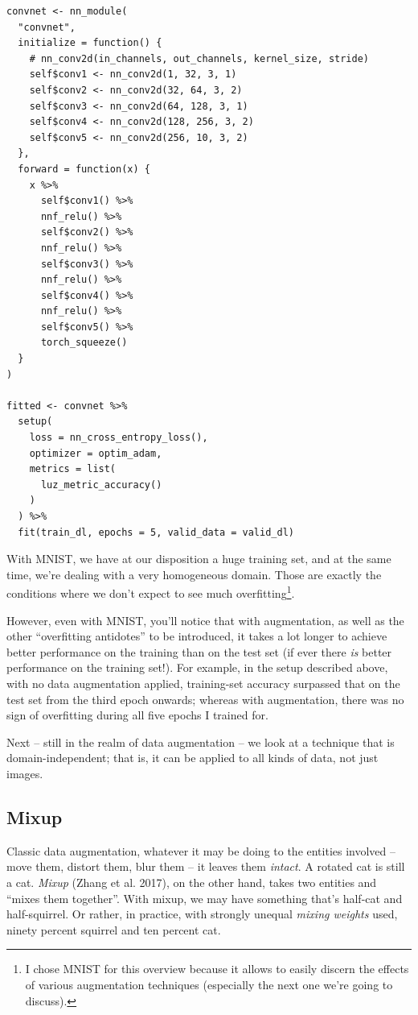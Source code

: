 \documentclass[
  letterpaper,
]{krantz}
\begin{document}
\begin{verbatim}
convnet <- nn_module(
  "convnet",
  initialize = function() {
    # nn_conv2d(in_channels, out_channels, kernel_size, stride)
    self$conv1 <- nn_conv2d(1, 32, 3, 1)
    self$conv2 <- nn_conv2d(32, 64, 3, 2)
    self$conv3 <- nn_conv2d(64, 128, 3, 1)
    self$conv4 <- nn_conv2d(128, 256, 3, 2)
    self$conv5 <- nn_conv2d(256, 10, 3, 2)
  },
  forward = function(x) {
    x %>%
      self$conv1() %>%
      nnf_relu() %>%
      self$conv2() %>%
      nnf_relu() %>%
      self$conv3() %>%
      nnf_relu() %>%
      self$conv4() %>%
      nnf_relu() %>%
      self$conv5() %>%
      torch_squeeze()
  }
)

fitted <- convnet %>%
  setup(
    loss = nn_cross_entropy_loss(),
    optimizer = optim_adam,
    metrics = list(
      luz_metric_accuracy()
    )
  ) %>%
  fit(train_dl, epochs = 5, valid_data = valid_dl)
\end{verbatim}

With MNIST, we have at our disposition a huge training set, and at the
same time, we're dealing with a very homogeneous domain. Those are
exactly the conditions where we don't expect to see much
overfitting\footnote{I chose MNIST for this overview because it allows
  to easily discern the effects of various augmentation techniques
  (especially the next one we're going to discuss).}.

However, even with MNIST, you'll notice that with augmentation, as well
as the other ``overfitting antidotes'' to be introduced, it takes a lot
longer to achieve better performance on the training than on the test
set (if ever there \emph{is} better performance on the training set!).
For example, in the setup described above, with no data augmentation
applied, training-set accuracy surpassed that on the test set from the
third epoch onwards; whereas with augmentation, there was no sign of
overfitting during all five epochs I trained for.

Next -- still in the realm of data augmentation -- we look at a
technique that is domain-independent; that is, it can be applied to all
kinds of data, not just images.

\hypertarget{mixup}{%
\subsection{\texorpdfstring{Mixup}{Mixup}}\label{mixup}}

Classic data augmentation, whatever it may be doing to the entities
involved -- move them, distort them, blur them -- it leaves them
\emph{intact}. A rotated cat is still a cat. \emph{Mixup} (Zhang et al.
2017), on the other hand, takes two entities and ``mixes them
together''. With mixup, we may have something that's half-cat and
half-squirrel. Or rather, in practice, with strongly unequal
\emph{mixing weights} used, ninety percent squirrel and ten percent cat.
\end{document}
